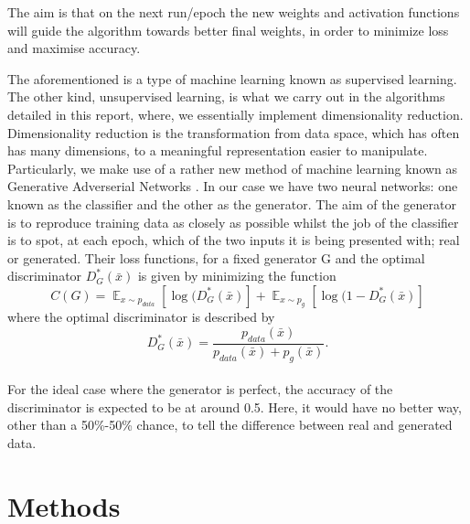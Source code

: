 \documentclass[11pt]{article} %
\DeclareMathOperator{\E}{\mathbb{E}}
\begin{document}
The aim is that on the next run/epoch
the new weights and activation functions will guide the algorithm towards better
final weights, in order to minimize loss and maximise accuracy.
\\
\par The aforementioned is a type of machine learning known as supervised learning.
The other kind, unsupervised learning, is what we carry out in the algorithms detailed in this report,
 where, we essentially implement dimensionality reduction.
Dimensionality reduction is the transformation from data space,
 which has often has many dimensions, to a meaningful representation easier to manipulate.
Particularly, we make use of a rather new method of machine learning known as Generative Adverserial Networks \cite{NIPS2014_5423} \cite{salimans2016improved}.
In our case we have two neural networks: one known as the classifier and the other as the generator.
The aim of the generator is to reproduce training data as closely as possible whilst the job of the classifier is to
spot, at each epoch, which of the two inputs it is being presented with; real or generated.
Their loss functions, for a fixed generator G and the optimal discriminator $D^*_G(\bar x)$ is given by minimizing the function \cite{NIPS2014_5423}
\begin{equation}
  C(G)=\E_{x\sim p_{data}}[\log (D^*_G(\bar x)]+\E_{x\sim p_{g}}[\log(1-D^*_G(\bar x)]
  \label{eq:minmax}
\end{equation}
where the optimal discriminator is described by
\begin{equation}
  D^*_G(\bar x)= \frac{p_{data}(\bar x)}{p_{data}(\bar x) + p_{g}(\bar x)}.
  \label{eq:optimal_disc}
\end{equation}
\\
For the ideal case where the generator is perfect, the accuracy of the discriminator is expected to be
at around 0.5.
Here, it would have no better way, other than a 50\%-50\% chance, to tell the difference between real and generated data.
\section{Methods}
\end{document}
